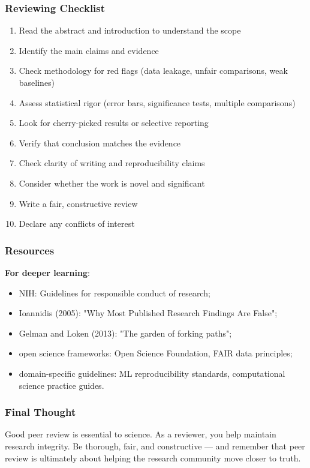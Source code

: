 \documentclass[]{beamer}
\begin{document}
\begin{frame}[fragile]
\frametitle{Reviewing Checklist}
{\footnotesize
\begin{enumerate}
  \item Read the abstract and introduction to understand the scope
  \item Identify the main claims and evidence
  \item Check methodology for red flags (data leakage, unfair comparisons, weak baselines)
  \item Assess statistical rigor (error bars, significance tests, multiple comparisons)
  \item Look for cherry-picked results or selective reporting
  \item Verify that conclusion matches the evidence
  \item Check clarity of writing and reproducibility claims
  \item Consider whether the work is novel and significant
  \item Write a fair, constructive review
  \item Declare any conflicts of interest
\end{enumerate}
}

\end{frame}

\begin{frame}[fragile]
\frametitle{Resources}
\textbf{For deeper learning}:
\begin{itemize}
  \item NIH: Guidelines for responsible conduct of research;
  \item Ioannidis (2005): "Why Most Published Research Findings Are False";
  \item Gelman and Loken (2013): "The garden of forking paths";
  \item open science frameworks: Open Science Foundation, FAIR data principles;
  \item domain-specific guidelines: ML reproducibility standards, computational science practice guides.
\end{itemize}

\end{frame}

\begin{frame}[fragile]
\frametitle{Final Thought}
Good peer review is essential to science. As a reviewer, you help maintain research integrity. Be thorough, fair, and constructive — and remember that peer review is ultimately about helping the research community move closer to truth.
\end{frame}
\end{document}
